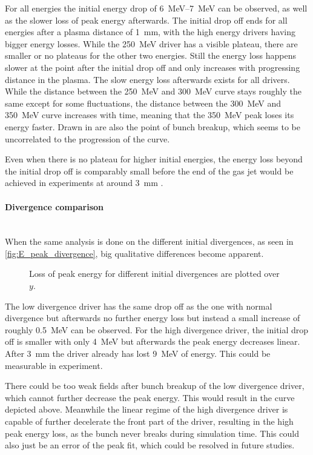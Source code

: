 \documentclass[bachelor_thesis]{subfiles}
\begin{document}
For all energies the initial energy drop of \qtyrange{6}{7}{\MeV} can be observed, as well as the slower loss of peak energy afterwards. The initial drop off ends for all energies after a plasma distance of \qty{1}{\mm}, with the high energy drivers having bigger energy losses. 
While the \qty{250}{\MeV} driver has a visible plateau, there are smaller or no plateaus for the other two energies. Still the energy loss happens slower at the point after the initial drop off and only increases with progressing distance in the plasma.
The slow energy loss afterwards exists for all drivers. While the distance between the \qty{250}{\MeV} and \qty{300}{\MeV} curve stays roughly the same except for some fluctuations, 
the distance between the \qty{300}{\MeV} and \qty{350}{\MeV} curve increases with time, meaning that the \qty{350}{\MeV} peak loses its energy faster. Drawn in are also the point of bunch breakup, which seems to be uncorrelated to the progression of the curve.

Even when there is no plateau for higher initial energies, the energy loss beyond the initial drop off is comparably small before the end of the gas jet would be achieved in experiments at around \qty{3}{\mm} \cite{Schoebel2022}.

\paragraph*{Divergence comparison}\hspace{0pt} \\
When the same analysis is done on the different initial divergences, as seen in \autoref{fig:E_peak_divergence}, big qualitative differences become apparent. 
\begin{figure}
	\centering
	
	\caption{Loss of peak energy for different initial divergences are plotted over $y$.}
	\label{fig:E_peak_divergence}
\end{figure}
The low divergence driver has the same drop off as the one with normal divergence but afterwards no further energy loss but instead a small increase of roughly \qty{0.5}{\MeV} can be observed.
For the high divergence driver, the initial drop off is smaller with only \qty{4}{\MeV} but afterwards the peak energy decreases linear. After \qty{3}{\mm} the driver already has lost \qty{9}{\MeV} of energy. This could be measurable in experiment.

There could be too weak fields after bunch breakup of the low divergence driver, which cannot further decrease the peak energy. This would result in the curve depicted above. 
Meanwhile the linear regime of the high divergence driver is capable of further decelerate the front part of the driver, resulting in the high peak energy loss, as the bunch never breaks during simulation time. 
This could also just be an error of the peak fit, which could be resolved in future studies.
\end{document}
